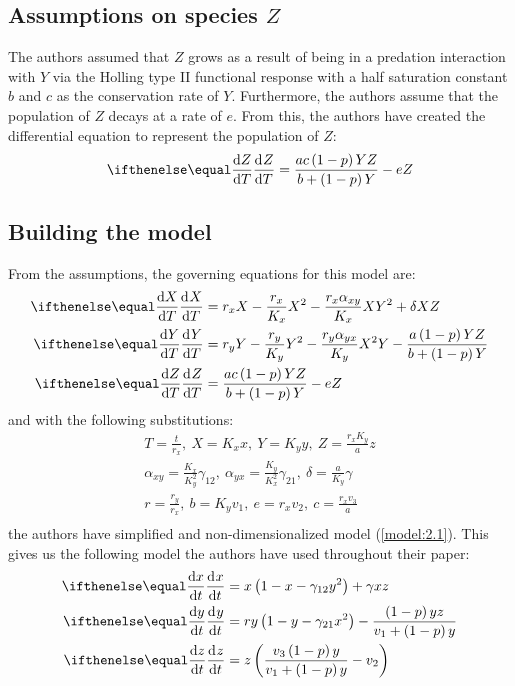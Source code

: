 \subsection{Assumptions on species $Z$}\label{subsec:assumptions_z}
The authors assumed that $Z$ grows as a result of being in a predation interaction with $Y$ via the Holling type II functional response with a half saturation constant $b$ and $c$ as the conservation rate of $Y$. Furthermore, the authors assume that the population of $Z$ decays at a rate of $e$. From this, the authors have created the differential equation to represent the population of $Z$:
\begin{equation}
    \diff[]{Z}{T} = \frac{ac\left(1-p\right)YZ}{b+\left(1-p\right)Y}-eZ
    \label{eq:2.3}
\end{equation}

\subsection{Building the model}\label{subsec:model}
From the assumptions, the governing equations for this model are:
\begin{subequations}
    \begin{align}
        \diff[]{X}{T} &= r_xX-\frac{r_x}{K_x}X^2-\frac{r_x\alpha_{xy}}{K_x}XY^2+\delta XZ
        \label{model:2.1a}\\
        \diff[]{Y}{T} &= r_yY-\frac{r_y}{K_y}Y^2-\frac{r_y\alpha_{yx}}{K_y}X^2Y-\frac{a\left(1-p\right)YZ}{b+\left(1-p\right)Y}
        \label{model:2.b}\\
        \diff[]{Z}{T} &= \frac{ac\left(1-p\right)YZ}{b+\left(1-p\right)Y}-eZ
        \label{model:2.1c}
    \end{align}
    \label{model:2.1}
\end{subequations}
and with the following substitutions:
\begin{gather*}
    T=\frac{t}{r_x},\ X=K_xx,\ Y=K_yy,\ Z=\frac{r_xK_y}{a}z\\
    \alpha_{xy}=\frac{K_x}{K_y^2}\gamma_{12},\ \alpha_{yx}=\frac{K_y}{K_x^2}\gamma_{21},\ \delta=\frac{a}{K_y}\gamma\\
    r=\frac{r_y}{r_x},\ b=K_yv_1,\ e=r_xv_2,\ c=\frac{r_xv_3}{a}\\
\end{gather*}
the authors have simplified and non-dimensionalized model (\ref{model:2.1}). This gives us the following model the authors have used throughout their paper:
\begin{subequations}
    \begin{align}
        \diff[]{x}{t} &= x\left(1-x-\gamma_{12}y^2\right)+\gamma xz
        \label{model:2.2a}\\
        \diff[]{y}{t} &= ry\left(1-y-\gamma_{21}x^2\right)-\frac{\left(1-p\right)yz}{v_1+\left(1-p\right)y}
        \label{model:2.2b}\\
        \diff[]{z}{t} &= z\left(\frac{v_3\left(1-p\right)y}{v_1+\left(1-p\right)y}-v_2\right)
        \label{model:2.2c}
    \end{align}
    \label{model:2.2}
\end{subequations}